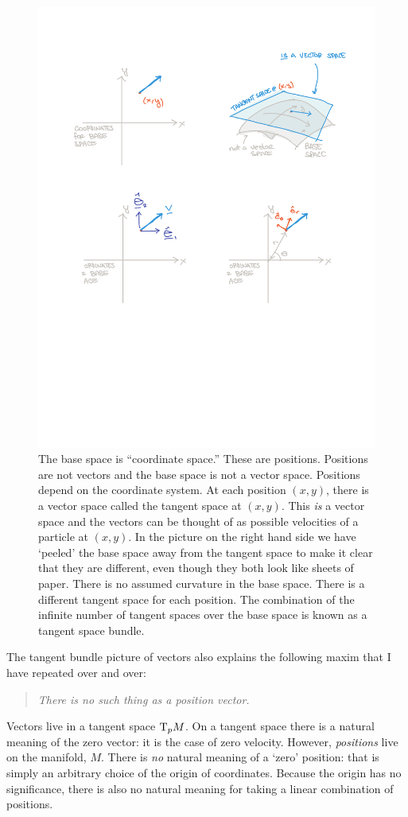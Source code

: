 \documentclass[12pt, oneside]{report}    %
\begin{document}
\begin{figure}[tb]
    \centering
    \includegraphics[width=.7\textwidth]{figures/base_space_tangent_space.pdf}
    \caption{The base space is ``coordinate space.'' These are positions. Positions are not vectors and the base space is not a vector space. Positions depend on the coordinate system. At each position $(x,y)$, there is a vector space called the tangent space at $(x,y)$. This \emph{is} a vector space and the vectors can be thought of as possible velocities of a particle at $(x,y)$. In the picture on the right hand side we have `peeled' the base space away from the tangent space to make it clear that they are different, even though they both look like sheets of paper. There is no assumed curvature in the base space. There is a different tangent space for each position. The combination of the infinite number of tangent spaces over the base space is known as a tangent space bundle.}
    \label{fig:tangent:space:polar}
\end{figure}

The tangent bundle picture of vectors also explains the following maxim that I have repeated over and over:
\begin{quote}
\emph{There is no such thing as a position vector.}
\end{quote}
Vectors live in a tangent space $\textnormal{T}_pM$. On a tangent space there is a natural meaning of the zero vector: it is the case of zero velocity. However, \emph{positions} live on the manifold, $M$. There is \emph{no} natural meaning of a `zero' position: that is simply an arbitrary choice of the origin of coordinates. Because the origin has no significance, there is also no natural meaning for taking a linear combination of positions.
\end{document}

